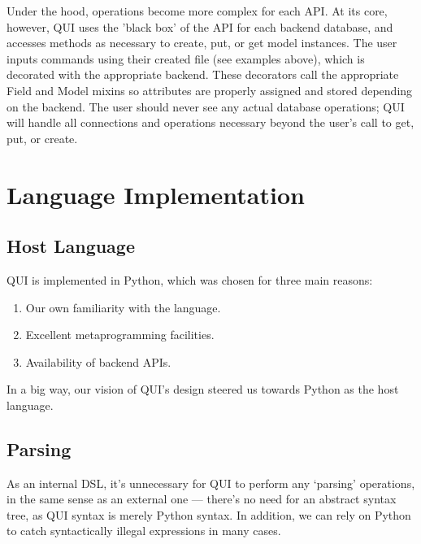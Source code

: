 \documentclass{article} %
\begin{document}
Under the hood, operations become more complex for each API.  At its core, however, QUI uses the 'black box' of the API for each backend database, and accesses methods
as necessary to create, put, or get model instances. The user inputs commands using their created file (see examples above), which is decorated with the appropriate backend. 
These decorators call the appropriate Field and Model mixins so attributes are properly assigned and stored depending on the backend. The user should never see any actual 
database operations; QUI will handle all connections and operations necessary beyond the user's call to get, put, or create.

\newpage
\section{Language Implementation}
\subsection{Host Language}
QUI is implemented in Python, which was chosen for three main reasons:
\begin{enumerate}
\item Our own familiarity with the language.
\item Excellent metaprogramming facilities.
\item Availability of backend APIs.
\end{enumerate}
In a big way, our vision of QUI's design steered us towards Python as the host language. 

\subsection{Parsing}
As an internal DSL, it's unnecessary for QUI to perform any `parsing' operations, in the same sense as an external one --- there's no need for an abstract syntax tree, as QUI syntax
is merely Python syntax. In addition, we can rely on Python to catch syntactically illegal expressions in many cases.
\end{document}
